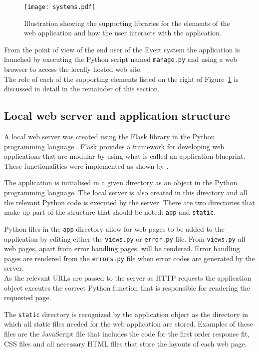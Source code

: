 \documentclass[a4paper,12pt]{article}
\begin{document}
\begin{figure}[htbp]
  \centering
  \texttt{[image: systems.pdf]}
  \caption[Programming library interaction an user view]{Illustration showing the supporting libraries for the elements of the web application and how the user interacts with the application.}
  \label{fig:libraries}
\end{figure}

From the point of view of the end user of the Evert system the application is launched by executing the Python script named \texttt{manage.py} and using a web browser to access the locally hosted web site.\\The role of each of the supporting elements listed on the right of Figure~\ref{fig:libraries} is discussed in detail in the remainder of this section.

\subsection{Local web server and application structure}
A local web server was created using the Flask library in the Python programming language \citep{flask}. Flask provides a framework for developing web applications that are modular by using what is called an application blueprint. These functionalities were implemented as shown by \citet{grinberg}.

The application is initialised in a given directory as an object in the Python programming language. The local server is also created in this directory and all the relevant Python code is executed by the server. There are two directories that make up part of the structure that should be noted: \texttt{app} and \texttt{static}.

Python files in the \texttt{app} directory allow for web pages to be added to the application by editing either the \texttt{views.py} or \texttt{error.py} file. From \texttt{views.py} all web pages, apart from error handling pages, will be rendered. Error handling pages are rendered from the \texttt{errors.py} file when error codes are generated by the server.\\As the relevant URLs are passed to the server as HTTP requests the application object executes the correct Python function that is responsible for rendering the requested page.

The \texttt{static} directory is recognized by the application object as the directory in which all static files needed for the web application are stored. Examples of these files are the JavaScript file that includes the code for the first order response fit, CSS files and all necessary HTML files that store the layouts of each web page.
\end{document}

